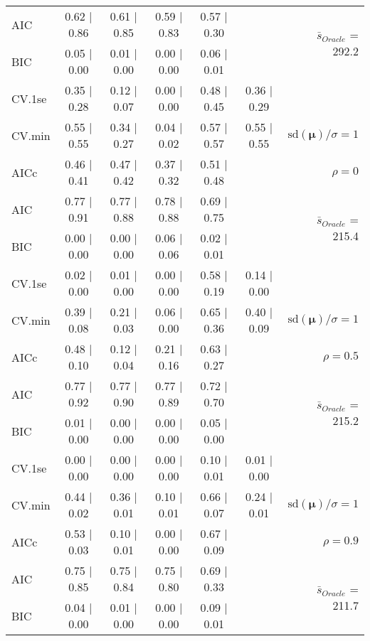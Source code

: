 \begin{table}
\begin{center}
\begin{tabular}{l*{5}{c}|r}
AIC & 0.62 $\mid$ 0.86 & 0.61 $\mid$ 0.85 & 0.59 $\mid$ 0.83 & 0.57 $\mid$ 0.30 & &  \multirow{2}{*}{$\bar{s}_{Oracle}$ = 292.2} \\
BIC & 0.05 $\mid$ 0.00 & 0.01 $\mid$ 0.00 & 0.00 $\mid$ 0.00 & 0.06 $\mid$ 0.01 & &  \\
 \hline 
CV.1se & 0.35 $\mid$ 0.28 & 0.12 $\mid$ 0.07 & 0.00 $\mid$ 0.00 & 0.48 $\mid$ 0.45 & 0.36 $\mid$ 0.29 & \\
CV.min & 0.55 $\mid$ 0.55 & 0.34 $\mid$ 0.27 & 0.04 $\mid$ 0.02 & 0.57 $\mid$ 0.57 & 0.55 $\mid$ 0.55 &  $\mathrm{sd}(\mathbf{\mu})/\sigma=1$ \\
AICc & 0.46 $\mid$ 0.41 & 0.47 $\mid$ 0.42 & 0.37 $\mid$ 0.32 & 0.51 $\mid$ 0.48 & & $\rho=0$ \\
AIC & 0.77 $\mid$ 0.91 & 0.77 $\mid$ 0.88 & 0.78 $\mid$ 0.88 & 0.69 $\mid$ 0.75 & &  \multirow{2}{*}{$\bar{s}_{Oracle}$ = 215.4} \\
BIC & 0.00 $\mid$ 0.00 & 0.00 $\mid$ 0.00 & 0.06 $\mid$ 0.06 & 0.02 $\mid$ 0.01 & &  \\
 \hline 
CV.1se & 0.02 $\mid$ 0.00 & 0.01 $\mid$ 0.00 & 0.00 $\mid$ 0.00 & 0.58 $\mid$ 0.19 & 0.14 $\mid$ 0.00 & \\
CV.min & 0.39 $\mid$ 0.08 & 0.21 $\mid$ 0.03 & 0.06 $\mid$ 0.00 & 0.65 $\mid$ 0.36 & 0.40 $\mid$ 0.09 &  $\mathrm{sd}(\mathbf{\mu})/\sigma=1$ \\
AICc & 0.48 $\mid$ 0.10 & 0.12 $\mid$ 0.04 & 0.21 $\mid$ 0.16 & 0.63 $\mid$ 0.27 & & $\rho=0.5$ \\
AIC & 0.77 $\mid$ 0.92 & 0.77 $\mid$ 0.90 & 0.77 $\mid$ 0.89 & 0.72 $\mid$ 0.70 & &  \multirow{2}{*}{$\bar{s}_{Oracle}$ = 215.2} \\
BIC & 0.01 $\mid$ 0.00 & 0.00 $\mid$ 0.00 & 0.00 $\mid$ 0.00 & 0.05 $\mid$ 0.00 & &  \\
 \hline 
CV.1se & 0.00 $\mid$ 0.00 & 0.00 $\mid$ 0.00 & 0.00 $\mid$ 0.00 & 0.10 $\mid$ 0.01 & 0.01 $\mid$ 0.00 & \\
CV.min & 0.44 $\mid$ 0.02 & 0.36 $\mid$ 0.01 & 0.10 $\mid$ 0.01 & 0.66 $\mid$ 0.07 & 0.24 $\mid$ 0.01 &  $\mathrm{sd}(\mathbf{\mu})/\sigma=1$ \\
AICc & 0.53 $\mid$ 0.03 & 0.10 $\mid$ 0.01 & 0.00 $\mid$ 0.00 & 0.67 $\mid$ 0.09 & & $\rho=0.9$ \\
AIC & 0.75 $\mid$ 0.85 & 0.75 $\mid$ 0.84 & 0.75 $\mid$ 0.80 & 0.69 $\mid$ 0.33 & &  \multirow{2}{*}{$\bar{s}_{Oracle}$ = 211.7} \\
BIC & 0.04 $\mid$ 0.00 & 0.01 $\mid$ 0.00 & 0.00 $\mid$ 0.00 & 0.09 $\mid$ 0.01 & &  \\

\end{tabular}
\end{center}
\end{table}
